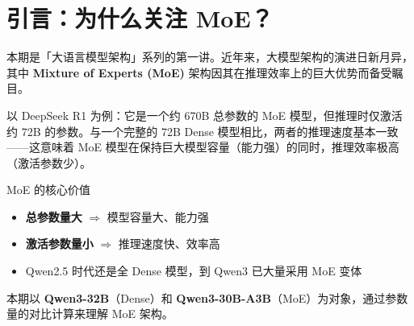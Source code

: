 \section{引言：为什么关注 MoE？}

本期是「大语言模型架构」系列的第一讲。近年来，大模型架构的演进日新月异，其中 \textbf{Mixture of Experts (MoE)} 架构因其在推理效率上的巨大优势而备受瞩目。

以 DeepSeek R1 为例：它是一个约 670B 总参数的 MoE 模型，但推理时仅激活约 72B 的参数。与一个完整的 72B Dense 模型相比，两者的推理速度基本一致——这意味着 MoE 模型在保持巨大模型容量（能力强）的同时，推理效率极高（激活参数少）。

\begin{importantbox}{MoE 的核心价值}
\begin{itemize}
  \item \textbf{总参数量大} $\Rightarrow$ 模型容量大、能力强
  \item \textbf{激活参数量小} $\Rightarrow$ 推理速度快、效率高
  \item Qwen2.5 时代还是全 Dense 模型，到 Qwen3 已大量采用 MoE 变体
\end{itemize}
\end{importantbox}

本期以 \textbf{Qwen3-32B}（Dense）和 \textbf{Qwen3-30B-A3B}（MoE）为对象，通过参数量的对比计算来理解 MoE 架构。

